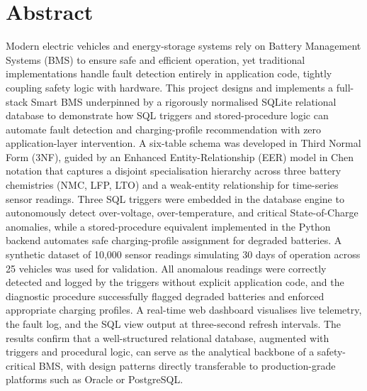 \documentclass[12pt, a4paper]{report}
\begin{document}

\newpage

\tableofcontents
\listoffigures        %
\listoftables         %
\newpage

\chapter*{Abstract}

Modern electric vehicles and energy-storage systems rely on Battery Management Systems (BMS) to ensure safe and efficient operation, yet traditional implementations handle fault detection entirely in application code, tightly coupling safety logic with hardware. This project designs and implements a full-stack Smart BMS underpinned by a rigorously normalised SQLite relational database to demonstrate how SQL triggers and stored-procedure logic can automate fault detection and charging-profile recommendation with zero application-layer intervention. A six-table schema was developed in Third Normal Form (3NF), guided by an Enhanced Entity-Relationship (EER) model in Chen notation that captures a disjoint specialisation hierarchy across three battery chemistries (NMC, LFP, LTO) and a weak-entity relationship for time-series sensor readings. Three SQL triggers were embedded in the database engine to autonomously detect over-voltage, over-temperature, and critical State-of-Charge anomalies, while a stored-procedure equivalent implemented in the Python backend automates safe charging-profile assignment for degraded batteries. A synthetic dataset of 10,000 sensor readings simulating 30 days of operation across 25 vehicles was used for validation. All anomalous readings were correctly detected and logged by the triggers without explicit application code, and the diagnostic procedure successfully flagged degraded batteries and enforced appropriate charging profiles. A real-time web dashboard visualises live telemetry, the fault log, and the SQL view output at three-second refresh intervals. The results confirm that a well-structured relational database, augmented with triggers and procedural logic, can serve as the analytical backbone of a safety-critical BMS, with design patterns directly transferable to production-grade platforms such as Oracle or PostgreSQL.
\end{document}
